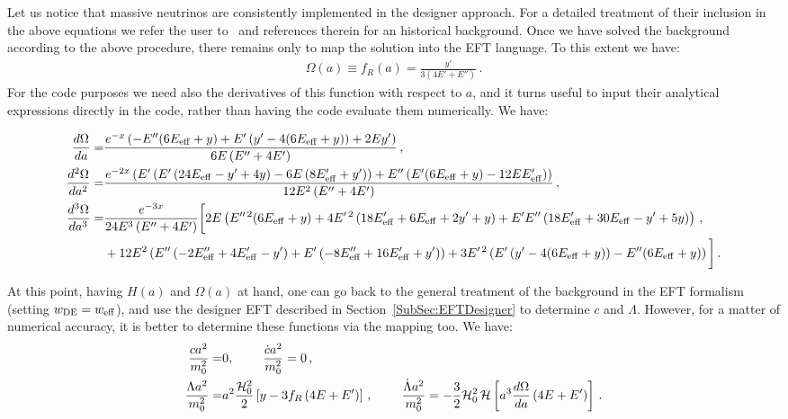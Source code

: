 \documentclass[prd,nofootinbib,showpacs]{revtex4}
\def\f{\frac}
\begin{document}
{%
Let us notice that massive neutrinos are consistently implemented in the designer approach. For a detailed treatment of their inclusion in the above equations we refer the user to~\cite{Hu:2014sea} and references therein for an historical background.
Once we have solved the background according to the above procedure, there remains only to map the solution into the EFT language. To this extent we have:
\begin{align}
\Omega(a)\equiv f_R(a)=\f{y'}{3(4E' + E'')}\,.
\end{align}
For the code purposes we need also the derivatives of this function with respect to $a$, and it turns useful to input their analytical expressions directly in the code, rather than having the code evaluate them numerically. We have:

\begin{align}\label{Omega_eqs}
\frac{d\Omega}{da} =& \frac{e^{-x} \left(-E'' (6 E_{\rm eff}+y)+E'\left(y'-4 (6 E_{\rm eff}+y)\right)+2 E y'\right)}{6 E \left(E''+4 E'\right)}\, , \nonumber\\
\frac{d^2\Omega}{da^2} =& \frac{e^{-2x} \left(E'\left(E'\left(24 E_{\rm eff} -y' +4 y \right)-6 E \left(8 E_{\rm eff}' +y' \right)\right)+E''  \left(E'  (6 E_{\rm eff} +y )-12 E  E_{\rm eff}' \right)\right)}{12 E ^2 \left(E'' +4 E' \right)}\, ,\nonumber \\
\frac{d^3\Omega}{da^3} =& \frac{e^{-3 x}}{24 E^3 \left(E'' +4 E' \right)} \bigg[2 E  \left(E^{\prime\prime\, 2} (6 E_{\rm eff} +y )+4 E^{\prime \, 2} \left(18 E_{\rm eff}' +6 E_{\rm eff} +2 y' +y \right)+E'  E''  \left(18 E_{\rm eff}' +30 E_{\rm eff} -y' +5 y \right)\right)\, , \nonumber\\
& +12 E^2 \left(E''  \left(-2 E_{\rm eff}'' +4 E_{\rm eff}' -y' \right)+E'  \left(-8 E_{\rm eff}'' +16 E_{\rm eff}' +y' \right)\right)+3 E^{\prime\,2} \left(E'  \left(y' -4 (6 E_{\rm eff} +y )\right)-E''  (6 E_{\rm eff} +y )\right)\bigg]\, .
\end{align}

At this point, having $H(a)$ and $\Omega(a)$ at hand, one can go back to the general treatment of the background in the EFT formalism (setting $w_{\rm DE}=w_{\rm eff}$), and use the designer EFT described in Section~\ref{SubSec:EFTDesigner} to determine $c$ and $\Lambda$. However, for a matter of numerical accuracy, it is better to determine these functions via the mapping too. We have:
\begin{align}
\frac{c a^2}{m_0^2} = &0,\hspace{0.8cm}  \frac{\dot{c}a^2}{m_0^2} = 0 \, , \nonumber\\
\frac{\Lambda a^2}{m_0^2} =& a^2 \frac{\mathcal{H}_0^2}{2}\left[y - 3 f_R\left(4 E + E' \right) \right]\, ,\hspace{0.8cm} \frac{\dot{\Lambda} a^2}{m_0^2} = -\frac{3}{2}\mathcal{H}_0^2\, \mathcal{H}\left[a^3\frac{d \Omega}{da}\left( 4E + E'\right) \right]\, .
\end{align}

}
\end{document}
